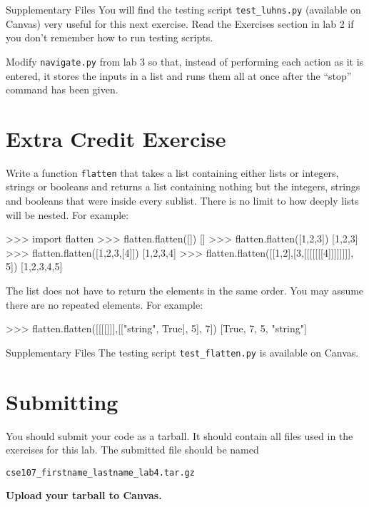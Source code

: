 \documentclass[11pt]{cselabheader}
\begin{document}
\begin{infobox}{Supplementary Files}
You will find the testing script \texttt{test\_luhns.py} (available on Canvas)
very useful for this next exercise. Read the Exercises section in lab 2 if you
don't remember how to run testing scripts.
\end{infobox}

\begin{ex}[navigate2.py] Modify \texttt{navigate.py} from lab 3 so that,
  instead of performing each action as it is entered, it stores the inputs in a
  list and runs them all at once after the ``stop'' command has been given.
\end{ex}

\section{Extra Credit Exercise}

\begin{extraex}[flatten.py]
Write a function \texttt{flatten} that takes a list containing either
lists or integers, strings or booleans and returns a list containing
nothing but the integers, strings and booleans that were inside every
sublist. There is no limit to how deeply lists will be nested.
For example:

\begin{pyconcode}
>>> import flatten
>>> flatten.flatten([])
[]
>>> flatten.flatten([1,2,3])
[1,2,3]
>>> flatten.flatten([1,2,3,[4]])
[1,2,3,4]
>>> flatten.flatten([[1,2],[3,[[[[[[[4]]]]]]]], 5])
[1,2,3,4,5]
\end{pyconcode}

The list does not have to return the elements in the same order.
You may assume there are no repeated elements.
For example:
\begin{pyconcode}
>>> flatten.flatten([[[[]]],[["string", True], 5], 7])
[True, 7, 5, "string"]
\end{pyconcode}
\end{extraex}

\begin{infobox}{Supplementary Files}
The testing script \texttt{test\_flatten.py} is available on Canvas.
\end{infobox}

\pagebreak
\section{Submitting}

You should submit your code as a tarball. It should contain all files
used in the exercises for this lab. The submitted file should be named
\begin{center}
  \texttt{cse107\_firstname\_lastname\_lab4.tar.gz}
\end{center}

\begin{center}
  \textbf{Upload your tarball to Canvas.}
\end{center}

\listofexercises
\listofextraexercises
\end{document}
